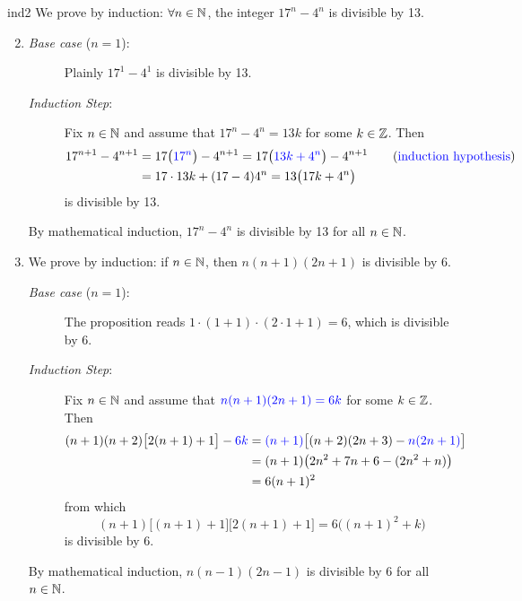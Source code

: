 \begin{examples}{}{ind2}
	\exstart We prove by induction: $\forall n\in\mathbb{N}$, the integer $17^n-4^n$ is divisible by 13.
	\begin{enumerate}\setcounter{enumi}{1}
		\item[]\begin{description}
			\item[\normalfont\emph{Base case} ($n=1$):] Plainly $17^1-4^1$ is divisible by 13.
			\item[\normalfont\emph{Induction Step}:] Fix $n\in\mathbb{N}$ and assume that $17^n-4^n=13k$ for some $k\in\mathbb{Z}$. Then
			\begin{align*}
				17^{n+1}-4^{n+1}
				&=17\bigl(\textcolor{blue}{17^n}\bigr)-4^{n+1}
					=17\bigl(\textcolor{blue}{13k+4^n}\bigr)-4^{n+1}
					\tag{\textcolor{blue}{induction hypothesis}}\\
				&=17\cdot 13k+(17-4)4^n 
					=13\bigl(17k+4^n\bigr)
			\end{align*}
			is divisible by 13.
		\end{description}
		By mathematical induction, $17^n-4^n$ is divisible by 13 for all $n\in\mathbb{N}$.		
		
		\item\label{ex:ind22} We prove by induction: if $n\in\mathbb{N}$, then $n(n+1)(2n+1)$ is divisible by 6.
		\begin{description}
			\item[\normalfont\emph{Base case} ($n=1$):] The proposition reads $1\cdot (1+1)\cdot (2\cdot 1+1)=6$, which is divisible by 6.
			\item[\normalfont\emph{Induction Step}:] Fix $n\in\mathbb{N}$ and assume that $\textcolor{blue}{n(n+1)(2n+1)=6k}$ for some $k\in\mathbb{Z}$. Then
			\begin{align*}
					(n+1)(n+2)\bigl[2(n+1)+1\bigr]-\textcolor{blue}{6k}&=\textcolor{blue}{(n+1)}\bigl[(n+2)(2n+3)-\textcolor{blue}{n(2n+1)}\bigr]\\
					&=(n+1)\bigl(2n^2+7n+6-(2n^2+n)\bigr)\\
					&=6(n+1)^2
				\end{align*}
			from which
			\[
				(n+1)\bigl[(n+1)+1\bigr]\bigl[2(n+1)+1\bigr] =6\bigl((n+1)^2+k\bigr)
			\]
			is divisible by 6.
		\end{description}
		By mathematical induction, $n(n-1)(2n-1)$ is divisible by 6 for all $n\in\mathbb{N}$.	
	\end{enumerate}
\end{examples}



